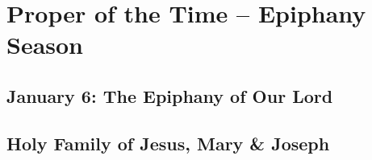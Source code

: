 {{\benedicamusdomino[2]{}
}

{
\chapter{Proper of the Time -- Epiphany Season}
\label{epiphany}
\section{January 6: The Epiphany of Our Lord}
\subtitle{ Class, White or Gold}

\subtitle{I \& II Vespers}

\def\definevesperspropersalt{}
\def\definevesperspropers{%
  \let\oldthing\maganttranslation
  \def\maganttranslation{\oldthing\vspace{-0.25\baselineskip}}
}
\def\vesperspropersaltnote{At I Vespers:}
\def\vesperspropersnote{At II Vespers:}
\def\prechapter{\vspace{-1\baselineskip}}
\def\beginchaptercols{\begin{parcolumns}[rulebetween,colwidths={1=0.42\linewidth}]{2}}
\def\prepsalmthreeverses{\vspace{-0.05\baselineskip}}
\def\prerepeatantiphonthree{}


\benedicamusdomino{}
}

{
\section{Holy Family of Jesus, Mary \& Joseph}
\subtitle{First Sunday after the Epiphany.}
\subtitle{ Class, White}

\subtitle{I \& II Vespers}

\def\prerepeatantiphontwo{\vspace{-0.5\baselineskip}}
\def\prevespers{%
  \let\oldthing\anttwotranslation
  \def\anttwotranslation{\vspace{-0.7\baselineskip}\oldthing\vspace{-0.7\baselineskip}}%
  \let\oldthingb\antthreetranslation
  \def\antthreetranslation{\oldthing\vspace{\baselineskip}}%
  \let\oldthingc\antfivetranslation
  \def\antfivetranslation{\oldthing\vspace{\baselineskip}}%
}

\benedicamusdomino[2]{}
}

}